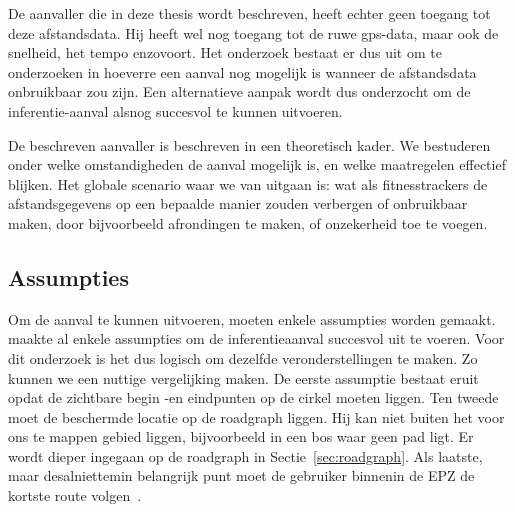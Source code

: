 De aanvaller die in deze thesis wordt beschreven, heeft echter geen toegang tot
deze afstandsdata. Hij heeft wel nog toegang tot de ruwe gps-data, maar ook de
snelheid, het tempo enzovoort. Het onderzoek bestaat er dus uit om te
onderzoeken in hoeverre een aanval nog mogelijk is wanneer de afstandsdata
onbruikbaar zou zijn. Een alternatieve aanpak wordt dus onderzocht om de
inferentie-aanval alsnog succesvol te kunnen uitvoeren.

De beschreven aanvaller is beschreven in een theoretisch kader. We bestuderen
onder welke omstandigheden de aanval mogelijk is, en welke maatregelen
effectief blijken. Het globale scenario waar we van uitgaan is: wat als
fitnesstrackers de afstandsgegevens op een bepaalde manier zouden verbergen of
onbruikbaar maken, door bijvoorbeeld afrondingen te maken, of onzekerheid toe
te voegen.

\subsection{Assumpties}\label{sec:assumpties}
Om de aanval te kunnen uitvoeren, moeten enkele assumpties worden gemaakt.
\citeauthor{Dhondt} maakte al enkele assumpties om de inferentieaanval
succesvol uit te voeren. Voor dit onderzoek is het dus logisch om dezelfde
veronderstellingen te maken. Zo kunnen we een nuttige vergelijking maken. De
eerste assumptie bestaat eruit opdat de zichtbare begin -en eindpunten op de
cirkel moeten liggen. Ten tweede moet de beschermde locatie op de roadgraph
liggen. Hij kan niet buiten het voor ons te mappen gebied liggen, bijvoorbeeld
in een bos waar geen pad ligt. Er wordt dieper ingegaan op de roadgraph in
Sectie~\ref{sec:roadgraph}. Als laatste, maar desalniettemin belangrijk punt
moet de gebruiker binnenin de \ac{EPZ} de kortste route volgen~\cite{Dhondt}.

